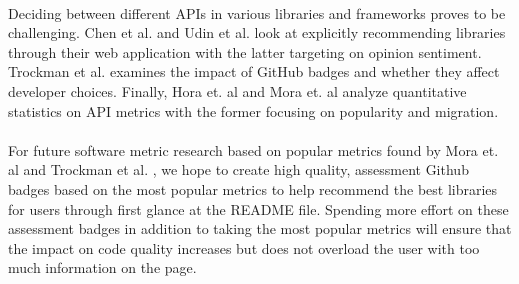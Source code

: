 \documentclass[12pt]{article}
\begin{document}
\paragraph{}
Deciding between different APIs in various libraries and frameworks proves to be challenging. 
Chen et al. \cite{analogical} and Udin et al. \cite{opinerarticle} look at explicitly recommending libraries through their web application with the latter targeting on opinion sentiment. 
Trockman et al. \cite{githubbadges} examines the impact of GitHub \cite{github} badges and whether they affect developer choices.
Finally, Hora et. al \cite{apiwave} and Mora et. al \cite{metrics} analyze quantitative statistics on API metrics with the former focusing on popularity and migration.

\paragraph{}
For future software metric research based on popular metrics found by Mora et. al \cite{metrics}
and Trockman et al. \cite{githubbadges}, we hope to create high quality, assessment Github \cite{github} badges
based on the most popular metrics to help recommend the best libraries for users through first
glance at the README file. Spending more effort on these assessment badges in addition to taking the most popular metrics 
will ensure that the impact on code quality increases
but does not overload the user with too much information on the page. 

\newpage


\end{document}
